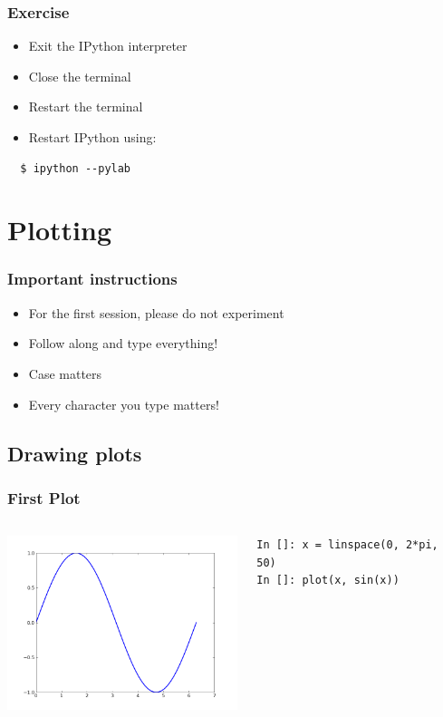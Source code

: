 \documentclass[14pt,compress]{beamer}
\newcounter{time}
\newcommand{\inctime}[1]{\addtocounter{time}{#1}{\tiny \thetime\ m}}
\begin{document}
\begin{frame}[fragile]
  \frametitle{Exercise}

  \begin{itemize}
  \item Exit the IPython interpreter
  \item Close the terminal
  \item Restart the terminal
  \item Restart IPython using:
  \end{itemize}
\begin{lstlisting}
  $ ipython --pylab
\end{lstlisting} %
  \inctime{10}
\end{frame}

\section{Plotting}

\begin{frame}
  \frametitle{Important instructions}
  \begin{itemize}
  \item For the first session, please do not experiment
  \item Follow along and type everything!
  \item Case matters
  \item Every character you type matters!
  \end{itemize}
\end{frame}

\subsection{Drawing plots}
\begin{frame}[fragile]
\frametitle{First Plot}
\begin{columns}
    \hspace*{-0.25in}
  \includegraphics[height=2in, interpolate=true]{data/firstplot}
    \begin{block}{}
    \begin{small}
\begin{lstlisting}
In []: x = linspace(0, 2*pi, 50)
In []: plot(x, sin(x))
\end{lstlisting}
    \end{small}
    \end{block}
\end{columns}
\end{frame}
\end{document}

